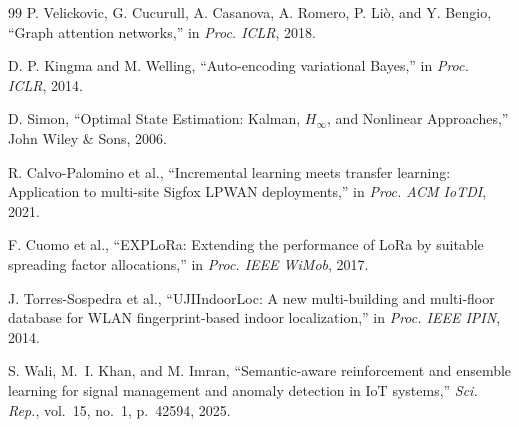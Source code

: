 \documentclass[conference]{IEEEtran}
\begin{document}
\begin{thebibliography}{99}
P. Velickovic, G. Cucurull, A. Casanova, A. Romero, P. Li\`{o},
and Y. Bengio,
``Graph attention networks,''
in \textit{Proc. ICLR}, 2018.

D. P. Kingma and M. Welling,
``Auto-encoding variational Bayes,''
in \textit{Proc. ICLR}, 2014.

D. Simon,
``Optimal State Estimation: Kalman, $H_\infty$, and Nonlinear Approaches,''
John Wiley \& Sons, 2006.

R. Calvo-Palomino et al.,
``Incremental learning meets transfer learning: Application to
multi-site Sigfox LPWAN deployments,''
in \textit{Proc. ACM IoTDI}, 2021.

F. Cuomo et al.,
``EXPLoRa: Extending the performance of LoRa by suitable spreading
factor allocations,''
in \textit{Proc. IEEE WiMob}, 2017.

J. Torres-Sospedra et al.,
``UJIIndoorLoc: A new multi-building and multi-floor database for WLAN
fingerprint-based indoor localization,''
in \textit{Proc. IEEE IPIN}, 2014.

S. Wali, M.~I. Khan, and M. Imran,
``Semantic-aware reinforcement and ensemble learning for signal management
and anomaly detection in IoT systems,''
\textit{Sci. Rep.}, vol.~15, no.~1, p.~42594, 2025.

\end{thebibliography}
\end{document}
